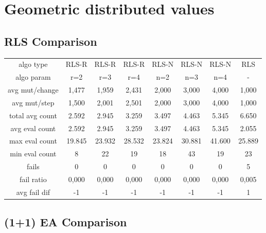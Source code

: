 
\section{Geometric distributed values}

\subsection{RLS Comparison}


\begin{tabular}[h]{cccccccc}
algo type&         RLS-R&  RLS-R&  RLS-R&  RLS-N&  RLS-N&  RLS-N&    RLS\\
algo param&          r=2&    r=3&    r=4&    n=2&    n=3&    n=4&      -\\
avg mut/change&    1,477&  1,959&  2,431&  2,000&  3,000&  4,000&  1,000\\
avg mut/step&      1,500&  2,001&  2,501&  2,000&  3,000&  4,000&  1,000\\
\hline
total avg count&   2.592&  2.945&  3.259&  3.497&  4.463&  5.345&  6.650\\
avg eval count&    2.592&  2.945&  3.259&  3.497&  4.463&  5.345&  2.055\\
max eval count&   19.845& 23.932& 28.532& 23.824& 30.881& 41.600& 25.889\\
min eval count&        8&     22&     19&     18&     43&     19&     23\\
\hline
fails&                 0&      0&      0&      0&      0&      0&      5\\
fail ratio&        0,000&  0,000&  0,000&  0,000&  0,000&  0,000&  0,005\\
avg fail dif&         -1&     -1&     -1&     -1&     -1&     -1&      1\\
\end{tabular}


\subsection{(1+1) EA Comparison}


